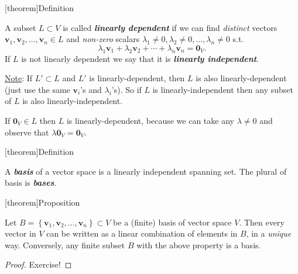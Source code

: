 \documentclass[12pt]{report}
\theoremstyle{definition}
\begin{document}
[theorem]{Definition}
\begin{linear independence}
    A subset $L \subset V$ is called \textbf{\emph{linearly dependent}} if
    we can find \emph{distinct} vectors $\pmb{v}_1, \pmb{v}_2,\ldots,\pmb{v}_n \in L$
    and \emph{non-zero} scalars $\lambda_1 \neq 0, \lambda_2 \neq 0,\ldots,\lambda_n \neq 0$ s.t.\[
        \lambda_1 \pmb{v}_1 + \lambda_2 \pmb{v}_2 + \cdots + \lambda_n \pmb{v}_n = \pmb{0}_V.
    \]
    If $L$ is not linearly dependent we say that it is \textbf{\emph{linearly independent}}.
\end{linear independence}

\underline{Note}: If $L' \subset L$ and $L'$ is linearly-dependent,
then $L$ is also linearly-dependent (just use the same $\pmb{v}_i$'s and $\lambda_i$'s).
So if $L$ is linearly-independent then any subset of $L$ is also linearly-independent.

\begin{ex}
    If $\pmb{0}_V \in L$ then $L$ is linearly-dependent,
    because we can take any $\lambda \neq 0$ and observe that $\lambda \pmb{0}_V = \pmb{0}_V$.
\end{ex}

[theorem]{Definition}
\begin{basis}
    A \textbf{\emph{basis}} of a vector space is a linearly independent spanning set.
    The plural of basis is \textbf{\emph{bases}}.
\end{basis}

[theorem]{Proposition}
\begin{v can be written with element of basis}\label{prop:1}
    Let $B = \left\{\pmb{v}_1, \pmb{v}_2, \ldots, \pmb{v}_n\right\} \subset V$ be a (finite)
    basis of vector space $V$. Then every vector in $V$ can be written as a linear combination
    of elements in $B$, in a \emph{unique} way.
    Conversely, any finite subset $B$ with the above property is a basis.
\end{v can be written with element of basis}

\begin{proof}
    Exercise!
\end{proof}
\end{document}
